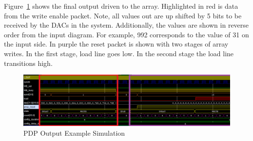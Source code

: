 Figure~\ref{fig:output_example} shows the final output driven to the array. Highlighted in red is data from the write enable packet. Note, all values out are up shifted by 5 bits to be received by the DACs in the system. Additionally, the values are shown in reverse order from the input diagram. For example, 992 corresponds to the value of 31 on the input side. In purple the reset packet is shown with two stages of array writes. In the first stage, load line goes low. In the second stage the load line transitions high.

\begin{figure}
    \centering
    \includegraphics[width=1.0\textwidth]{fig/pdp_output_example.png}
    \caption{PDP Output Example Simulation}
    \label{fig:output_example}
\end{figure}
